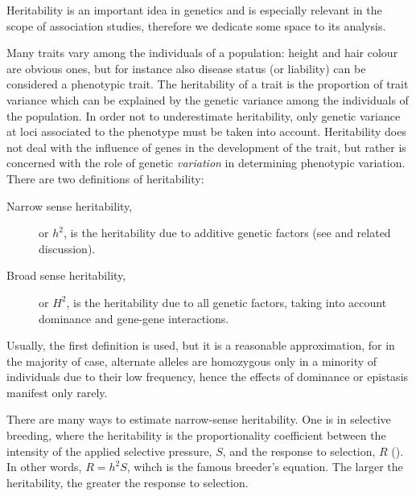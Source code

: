 \documentclass[../main.tex]{subfiles}
\begin{document}
Heritability is an important idea in genetics and is especially relevant 
in the scope of association studies, therefore we dedicate some space to 
its analysis.

Many traits vary among the individuals of a population: height and hair 
colour are obvious ones, but for instance also disease status (or 
liability) can be considered a phenotypic trait. The heritability of a 
trait is the proportion of trait variance which can be explained by the 
genetic variance among the individuals of the population. In order not 
to underestimate heritability, only genetic variance at loci associated 
to the phenotype must be taken into account. Heritability does not deal 
with the influence of genes in the development of the trait, but rather 
is concerned with the role of genetic \textit{variation} in determining 
phenotypic variation. There are two definitions of heritability:

\begin{description}
	\item[Narrow sense heritability,] or $h^2$, is the heritability due 
to additive genetic factors (see  and related 
discussion).
	\item[Broad sense heritability,] or $H^2$, is the heritability due 
to all genetic factors, taking into account dominance and gene-gene 
interactions.
\end{description}


Usually, the first definition is used, but it is a reasonable 
approximation, for in the majority of case, alternate alleles are 
homozygous only in a minority of individuals due to their low frequency, 
hence the effects of dominance or epistasis manifest only 
rarely\autocite{Visscher2008}.

There are many ways to estimate narrow-sense heritability. One is in 
selective breeding, where the heritability is the proportionality 
coefficient between the intensity of the applied selective pressure, 
$S$, and the response to selection, $R$ (). In other 
words, $R = h^2 S$, wihch is the famous breeder's equation. The larger 
the heritability, the greater the response to selection.
\end{document}
